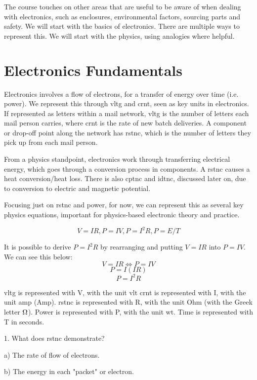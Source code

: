 \documentclass[a4paper,11pt]{report}
\newcommand{\Quiz}[1] %
{
\par\noindent %
\phantomsection %
\todo[inline, color=blue!30]{\textbf{#1}} %
\vspace{1em} %
}
\begin{document}
The course touches on other areas that are useful to be aware of when dealing with electronics, such as enclosures, environmental factors, sourcing parts and safety. We will start with the basics of electronics. There are multiple ways to represent this. We will start with the physics, using analogies where helpful.

\pagebreak

\section{Electronics Fundamentals}

Electronics involves a flow of electrons, for a transfer of energy over time (i.e. power). We represent this through \gls{vltg} and \gls{crnt}, seen as key units in electronics. If represented as letters within a mail network, \gls{vltg} is the number of letters each mail person carries, where \gls{crnt} is the rate of new batch deliveries. A component or drop-off point along the network has \gls{rstnc}, which is the number of letters they pick up from each mail person.

From a physics standpoint, electronics work through transferring electrical energy, which goes through a conversion process in components. A \gls{rstnc} causes a heat conversion/heat loss. There is also \gls{cptnc} and \gls{idtnc}, discussed later on, due to conversion to electric and magnetic potential.

Focusing just on \gls{rstnc} and power, for now, we can represent this as several key physics equations, important for physics-based electronic theory and practice.

\[V=IR , P=IV , P=I^2R , P=E/T\]

It is possible to derive $P=I^2R$ by rearranging and putting $V=IR$ into $P=IV$. We can see this below:
\[V=IR \Longleftrightarrow P=IV\]
\[P=I(IR)\]
\[P=I^2R\]

\gls{vltg} is represented with V, with the unit \gls{vlt} \gls{crnt} is represented with I, with the unit \gls{amp} (Amp). \gls{rstnc} is represented with R, with the unit Ohm (with the Greek letter $\ohm$). Power is represented with P, with the unit \gls{wt}. Time is represented with T in seconds.

\Quiz{Quiz}

1. What does \gls{rstnc} demonstrate?

a) The rate of flow of electrons.

b) The energy in each "packet" or electron.
\end{document}
